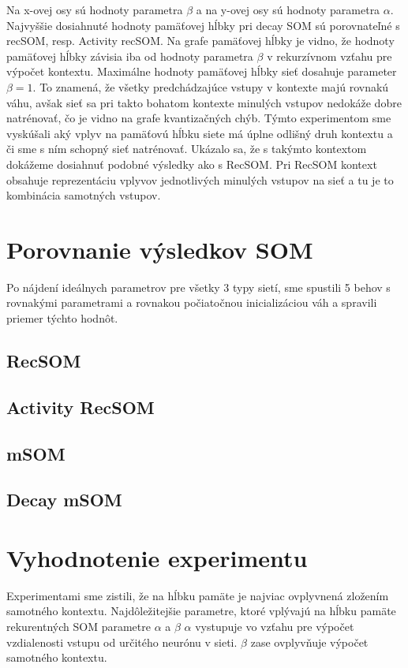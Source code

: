 Na x-ovej osy sú hodnoty parametra $\beta$ a na y-ovej osy sú hodnoty parametra $\alpha$.
Najvyššie dosiahnuté hodnoty pamäťovej hĺbky pri decay SOM sú porovnateľné s recSOM, resp. Activity recSOM.
Na grafe pamäťovej hĺbky je vidno, že hodnoty pamäťovej hĺbky závisia iba od hodnoty parametra $\beta$ v rekurzívnom vzťahu
pre výpočet kontextu.
Maximálne hodnoty pamäťovej hĺbky sieť dosahuje parameter $\beta = 1$. To znamená, že všetky predchádzajúce vstupy v kontexte majú
rovnakú váhu, avšak sieť sa pri takto bohatom kontexte minulých vstupov nedokáže dobre natrénovať, čo je vidno na grafe kvantizačných chýb.
Týmto experimentom sme vyskúšali aký vplyv na pamäťovú hĺbku siete má úplne odlišný druh kontextu a či sme s ním schopný sieť natrénovať.
Ukázalo sa, že s takýmto kontextom dokážeme dosiahnuť podobné výsledky ako s RecSOM. 
Pri RecSOM kontext obsahuje reprezentáciu vplyvov jednotlivých minulých vstupov na sieť a tu je to kombinácia samotných vstupov. 



\section {Porovnanie výsledkov SOM}
Po nájdení ideálnych parametrov pre všetky 3 typy sietí, sme spustili 5 behov s rovnakými
parametrami a rovnakou počiatočnou inicializáciou váh a spravili priemer týchto hodnôt.

\subsection{RecSOM}

\subsection{Activity RecSOM}
\subsection{mSOM}

\subsection{Decay mSOM}



\section{ Vyhodnotenie experimentu }
Experimentami sme zistili, že na hĺbku pamäte je najviac ovplyvnená zložením samotného kontextu.
Najdôležitejšie parametre, ktoré vplývajú na hĺbku pamäte rekurentných SOM parametre $\alpha$ a $\beta$
$\alpha$ vystupuje vo vzťahu pre výpočet vzdialenosti vstupu od určitého neurónu v sieti.
$\beta$ zase ovplyvňuje výpočet samotného kontextu.



